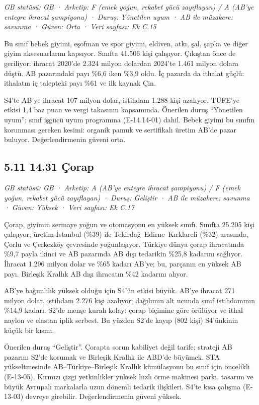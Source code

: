 \emph{GB statüsü: GB · Arketip: F (emek yoğun, rekabet gücü zayıflayan) / A (AB'ye entegre ihracat şampiyonu) · Duruş: Yönetilen uyum · AB ile müzakere: savunma · Güven: Orta · Veri sayfası: Ek C.15}

Bu sınıf bebek giyimi, eşofman ve spor giyimi, eldiven, atkı, şal, şapka ve diğer giyim aksesuarlarını kapsıyor. Sınıfta 41.506 kişi çalışıyor. Çıkıştan önce de geriliyor: ihracat 2020'de 2.324 milyon dolardan 2024'te 1.461 milyon dolara düştü. AB pazarındaki payı \%6,6 iken \%3,9 oldu. İç pazarda da ithalat güçlü: ithalatın iç talepteki payı \%61 ve ilk kaynak Çin.

S4'te AB'ye ihracat 107 milyon dolar, istihdam 1.288 kişi azalıyor. TÜFE'ye etkisi 1,4 baz puan ve vergi takasının kapsamında. Önerilen duruş ``Yönetilen uyum''; sınıf işgücü uyum programına (E-14.14-01) dahil. Bebek giyimi bu sınıfın korunması gereken kesimi: organik pamuk ve sertifikalı üretim AB'de pazar buluyor. Değerlendirmenin güveni orta.

\hypertarget{nace_kartlar_13-15-511-1431-uxe7orap}{%
\subsection{5.11 14.31 Çorap}\label{nace_kartlar_13-15-511-1431-uxe7orap}}

\emph{GB statüsü: GB · Arketip: A (AB'ye entegre ihracat şampiyonu) / F (emek yoğun, rekabet gücü zayıflayan) · Duruş: Geliştir · AB ile müzakere: savunma · Güven: Yüksek · Veri sayfası: Ek C.17}

Çorap, giyimin sermaye yoğun ve otomasyonu en yüksek sınıfı. Sınıfta 25.205 kişi çalışıyor; üretim İstanbul (\%39) ile Tekirdağ--Edirne--Kırklareli (\%32) arasında, Çorlu ve Çerkezköy çevresinde yoğunlaşıyor. Türkiye dünya çorap ihracatında \%9,7 payla ikinci ve AB pazarında AB dışı tedarikin \%25,8 kadarını sağlıyor. İhracat 1.296 milyon dolar ve \%65 kadarı AB'ye; bu, parçanın en yüksek AB payı. Birleşik Krallık AB dışı ihracatın \%42 kadarını alıyor.

AB'ye bağımlılık yüksek olduğu için S4'ün etkisi büyük. AB'ye ihracat 271 milyon dolar, istihdam 2.276 kişi azalıyor; dağılımın alt ucunda sınıf istihdamının \%14,9 kadarı. S2'de menşe kuralı kolay: çorap biçimine göre örülüyor ve ithal naylon ve elastan iplik serbest. Bu yüzden S2'de kayıp (802 kişi) S4'ünkinin küçük bir kısmı.

Önerilen duruş ``Geliştir''. Çorapta sorun kabiliyet değil tarife; strateji AB pazarını S2'de korumak ve Birleşik Krallık ile ABD'de büyümek. STA yükseltmesinde AB--Türkiye--Birleşik Krallık kümülasyonu bu sınıf için öncelikli (E-13-05). Kırmızı çizgi yetkinlikler yüksek hızlı örme makinesi parkı, tasarım ve büyük Avrupalı markalarla uzun dönemli tedarik ilişkileri. S4'te kısa çalışma (E-13-03) devreye girebilir. Değerlendirmenin güveni yüksek.

